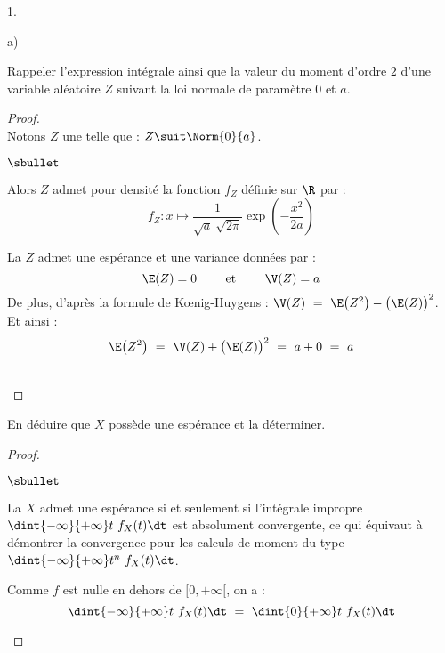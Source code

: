 \documentclass[11pt]{article}%
\begin{document}
\begin{noliste}{1.}
\begin{noliste}{a)}
  \item Rappeler l'expression intégrale ainsi que la valeur du moment
    d'ordre $2$ d'une variable aléatoire $Z$ suivant la loi normale de
    paramètre $0$ et $a$.

    \begin{proof}~\\%
      Notons $Z$ une \var telle que : $Z \suit \Norm{0}{a}$.
      \begin{noliste}{$\sbullet$}
      \item Alors $Z$ admet pour densité la fonction $f_Z$ définie sur
        $\R$ par : 
        \[
        f_Z : x \mapsto \dfrac{1}{\sqrt{a} \ \sqrt{2\pi}}
        \exp\left(-\dfrac{x^2}{2a} \right)
        \]

      \item La \var $Z$ admet une espérance et une variance données
        par :
        \[
        \E(Z) = 0 \qquad \text{ et } \qquad \V(Z) = a
        \]
        De plus, d'après la formule de K\oe{}nig-Huygens : $\V(Z) \ =
        \ \E\big( Z^2 \big) - \big( \E(Z) \big)^2$. Et ainsi :
        \[
        \E\big( Z^2 \big) \ = \ \V(Z) + \big( \E(Z) \big)^2 \ = \ a +
        0 \ = \ a
        \]
      \end{noliste}
    ~\\[-1.4cm]
    \end{proof}

  \item En déduire que $X$ possède une espérance et la déterminer.

    \begin{proof}~%
      \begin{noliste}{$\sbullet$}
      \item La \var $X$ admet une espérance si et seulement si
        l'intégrale impropre $\dint{-\infty}{+\infty} t \ f_X(t) \dt$
        est absolument convergente, ce qui équivaut à démontrer la
        convergence pour les calculs de moment du type
        $\dint{-\infty}{+\infty} t^n \ f_X(t) \dt$.




      \item Comme $f$ est nulle en dehors de $[0, +\infty[$, on a :
        \[
        \dint{-\infty}{+\infty} t \ f_X(t) \dt \ = \ \dint{0}{+\infty}
        t \ f_X(t) \dt
        \]        


\end{noliste}
\end{proof}
\end{noliste}
\end{noliste}
\end{document}
